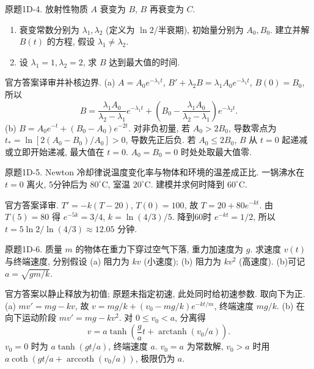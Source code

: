 \begin{exercise}\label{cw:bank-1D-4}
原题1D-4. 放射性物质 $A$ 衰变为 $B$, $B$ 再衰变为 $C$.
\begin{enumerate}[label=\alph*)]
\item 衰变常数分别为 $\lambda_1,\lambda_2$ (定义为 $\ln2$/半衰期), 初始量分别为 $A_0,B_0$. 建立并解 $B(t)$ 的方程, 假设 $\lambda_1\ne\lambda_2$.
\item 设 $\lambda_1=1,\lambda_2=2$, 求 $B$ 达到最大值的时间.
\end{enumerate}
\end{exercise}
\begin{solution}
官方答案译审并补核边界. (a) $A=A_0e^{-\lambda_1t}$, $B'+\lambda_2B=\lambda_1A_0e^{-\lambda_1t}$, $B(0)=B_0$, 所以
\[
 B=\frac{\lambda_1A_0}{\lambda_2-\lambda_1}e^{-\lambda_1t}+\left(B_0-\frac{\lambda_1A_0}{\lambda_2-\lambda_1}\right)e^{-\lambda_2t}.
\]
(b) $B=A_0e^{-t}+(B_0-A_0)e^{-2t}$. 对非负初量, 若 $A_0>2B_0$, 导数零点为 $t_* =\ln[2(A_0-B_0)/A_0]>0$, 导数先正后负. 若 $A_0\le2B_0$, $B$ 从 $t=0$ 起递减或立即开始递减, 最大值在 $t=0$. $A_0=B_0=0$ 时处处取最大值零.
\end{solution}
\begin{exercise}\label{cw:bank-1D-5}
原题1D-5. Newton 冷却律说温度变化率与物体和环境的温差成正比. 一锅沸水在 $t=0$ 离火, 5分钟后为 $80^\circ\mathrm C$, 室温 $20^\circ\mathrm C$. 建模并求何时降到 $60^\circ\mathrm C$.
\end{exercise}
\begin{solution}
官方答案译审. $T'=-k(T-20)$, $T(0)=100$, 故 $T=20+80e^{-kt}$. 由 $T(5)=80$ 得 $e^{-5k}=3/4$, $k=\ln(4/3)/5$. 降到60时 $e^{-kt}=1/2$, 所以 $t=5\ln2/\ln(4/3)\approx12.05$ 分钟.
\end{solution}
\begin{exercise}\label{cw:bank-1D-6}
原题1D-6. 质量 $m$ 的物体在重力下穿过空气下落, 重力加速度为 $g$. 求速度 $v(t)$ 与终端速度, 分别假设 (a) 阻力为 $kv$ (小速度); (b) 阻力为 $kv^2$ (高速度). (b)可记 $a=\sqrt{gm/k}$.
\end{exercise}
\begin{solution}
官方答案以静止释放为初值; 原题未指定初速, 此处同时给初速参数. 取向下为正. (a) $mv'=mg-kv$, 故 $v=mg/k+(v_0-mg/k)e^{-kt/m}$, 终端速度 $mg/k$. (b) 在向下运动阶段 $mv'=mg-kv^2$. 对 $0\le v_0<a$, 分离得
\[
 v=a\tanh\left(\frac{g}{a}t+\operatorname{arctanh}(v_0/a)\right).
\]
$v_0=0$ 时为 $a\tanh(gt/a)$, 终端速度 $a$. $v_0=a$ 为常数解, $v_0>a$ 时用 $a\coth(gt/a+\operatorname{arccoth}(v_0/a))$, 极限仍为 $a$.
\end{solution}
